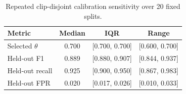 \begin{table}[tbp]
\caption{Repeated clip-disjoint calibration sensitivity over 20 fixed splits.}
\label{tab:repeated_split_sensitivity}
\small
\centering
\begin{tabular}{lccc}
\toprule
Metric & Median & IQR & Range \\
\midrule
Selected $\theta$ & 0.700 & [0.700, 0.700] & [0.600, 0.700] \\
Held-out F1 & 0.889 & [0.880, 0.907] & [0.844, 0.937] \\
Held-out recall & 0.925 & [0.900, 0.950] & [0.867, 0.983] \\
Held-out FPR & 0.020 & [0.017, 0.026] & [0.010, 0.033] \\
\bottomrule
\end{tabular}
\end{table}
